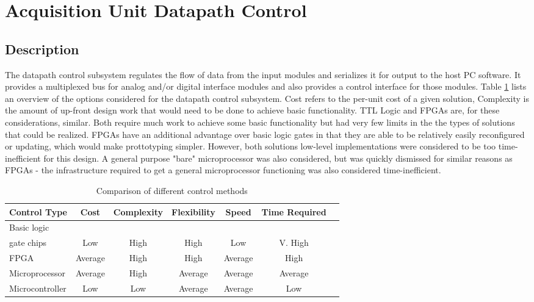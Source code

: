 
\section[Datapath Control]{Acquisition Unit Datapath Control}
\subsection{Description}
The datapath control subsystem regulates the flow of data from the input modules
 and serializes it for output to the host PC software. It provides a multiplexed bus for analog and/or digital interface modules and also provides a control interface for those modules. 
Table \ref{tab:control comparison} lists an overview of the options considered for the datapath control
 subsystem. Cost refers to the per-unit cost of a given solution, Complexity is the amount of up-front 
design work that would need to be done to achieve basic functionality. TTL Logic and FPGAs are, for 
these considerations, similar. Both require much work to achieve some basic functionality but had very 
few limits in the the types of solutions that could be realized. FPGAs have an additional advantage over
 basic logic gates in that they are able to be relatively easily reconfigured or updating, which would 
make prottotyping simpler. However, both solutions low-level implementations were considered to be too 
time-inefficient for this design. A general purpose "bare" microprocessor was also considered, but was 
quickly dismissed for similar reasons as FPGAs - the infrastructure required to get a general 
microprocessor functioning was also considered time-inefficient.
\begin{table}[bp]
\caption[Controllers]{Comparison of different control methods}
\begin{tabular}{l| c c c c c c}
		Control Type & Cost & Complexity & Flexibility & Speed & Time Required\\ \hline
		Basic logic  &     &      &      &     & \\
		  gate chips & Low & High & High & Low & V. High \\ 
		FPGA & Average & High & High & Average & High  \\
		Microprocessor & Average & High & Average & Average & Average \\
		Microcontroller & Low & Low & Average & Average & Low \\
\end{tabular}
\label{tab:control comparison}
\end{table}

